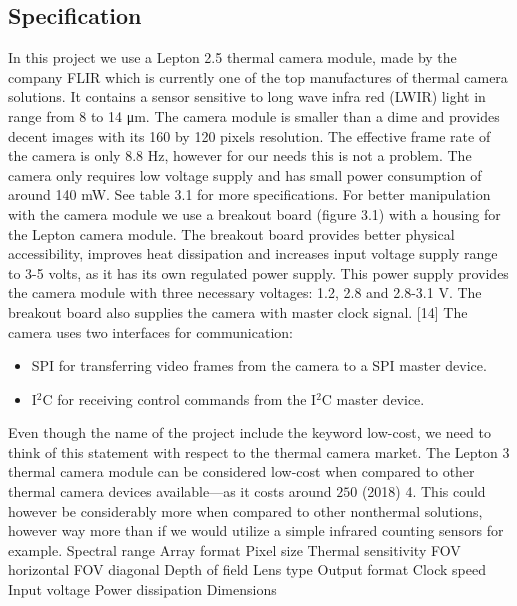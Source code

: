 \subsection{Specification}
In this project we use a Lepton 2.5 thermal camera module, made by the company FLIR which is currently one of the top manufactures of thermal camera solutions. It contains a sensor sensitive to long wave infra red (LWIR) light in range from 8 to 14 \si{\micro\meter}.
The camera module is smaller than a dime and provides decent images with its 160 by 120 pixels resolution. The effective frame rate of the camera is only 8.8 \si{\hertz}, however for our needs this is not a problem. The camera only requires low voltage supply and has small power consumption of around 140 \si{\milli\watt}. See table 3.1 for more specifications.
For better manipulation with the camera module we use a breakout board (figure 3.1) with a housing for the Lepton camera module. The breakout board provides better physical accessibility, improves heat dissipation and increases input voltage supply range to 3-5 volts, as it has its own regulated power supply. This power supply provides the camera module with three necessary voltages: 1.2, 2.8 and 2.8-3.1 \si{\volt}. The breakout board also supplies the camera with master clock signal. [14] The camera uses two interfaces for communication:
\begin{itemize}
    \item SPI for transferring video frames from the camera to a SPI master device.
    \item I$^{2}$C for receiving control commands from the I$^{2}$C master device.
\end{itemize}
Even though the name of the project include the keyword low-cost, we need to think of this statement with respect to the thermal camera market. The Lepton 3 thermal camera module can be considered low-cost when compared to other thermal camera devices available—as it costs around $250$ (2018) 4.
This could however be considerably more when compared to other nonthermal solutions, however way more than if we would utilize a simple infrared counting sensors for example.
Spectral range Array format Pixel size Thermal sensitivity FOV horizontal FOV diagonal Depth of field Lens type Output format Clock speed Input voltage Power dissipation Dimensions

